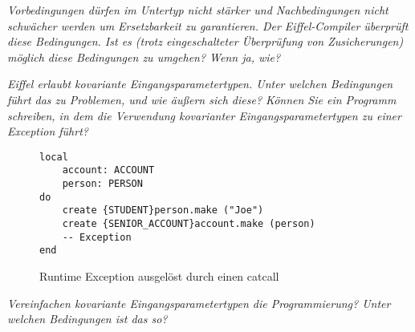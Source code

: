 \documentclass[a4paper,10pt]{article}
\begin{document}
\emph{Vorbedingungen dürfen im Untertyp nicht stärker und Nachbedingungen nicht 
schwächer werden um Ersetzbarkeit zu garantieren. Der Eiffel-Compiler überprüft 
diese Bedingungen. Ist es (trotz eingeschalteter Überprüfung von Zusicherungen) 
möglich diese Bedingungen zu umgehen? Wenn ja, wie?}

\vspace{3mm}


\vspace{3mm}


\emph{Eiffel erlaubt kovariante Eingangsparametertypen. Unter welchen Bedingungen 
führt das zu Problemen, und wie äußern sich diese? Können Sie ein Programm 
schreiben, in dem die Verwendung kovarianter Eingangsparametertypen zu einer 
Exception führt?}

\vspace{3mm}


\begin{comment}
See http://docs.eiffel.com/book/method/et-inheritance#Covariance.2C_anchored_declarations.2C_and_.22catcalls.22
\end{comment}

\begin{figure}
\begin{lstlisting}
local
    account: ACCOUNT
    person: PERSON
do
    create {STUDENT}person.make ("Joe")
    create {SENIOR_ACCOUNT}account.make (person)
    -- Exception
end
\end{lstlisting}
\caption{Runtime Exception ausgel\"ost durch einen catcall}
\end{figure}

\vspace{3mm}


\emph{Vereinfachen kovariante Eingangsparametertypen die Programmierung? Unter 
welchen Bedingungen ist das so?}

\vspace{3mm}


\begin{comment}
Von OOP: Mehrfach dynamisches Binden, Multimethoden.
\end{comment}
\end{document}
